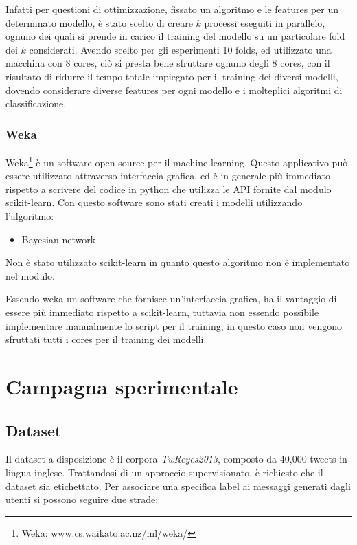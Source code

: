 \documentclass[oneside]{book}
\begin{document}
Infatti per questioni di ottimizzazione, fissato un algoritmo e le features per un determinato modello, è stato scelto di creare $k$ processi eseguiti in parallelo, ognuno dei quali si prende in carico il training del modello su un particolare fold dei $k$ considerati. Avendo scelto per gli esperimenti 10 folds, ed utilizzato una macchina con 8 cores, ciò si presta bene sfruttare ognuno degli 8 cores, con il risultato di ridurre il tempo totale impiegato per il training dei diversi modelli, dovendo considerare diverse features per ogni modello e i molteplici algoritmi di classificazione.

\subsection{Weka}

Weka\footnote{Weka: www.cs.waikato.ac.nz/ml/weka/} è un software open source per il machine learning. Questo applicativo può essere utilizzato attraverso interfaccia grafica, ed è in generale più immediato rispetto a scrivere del codice in python che utilizza le API fornite dal modulo scikit-learn. Con questo software sono stati creati i modelli utilizzando l'algoritmo:
\begin{itemize}
	\item Bayesian network
\end{itemize}
Non è stato utilizzato scikit-learn in quanto questo algoritmo non è implementato nel modulo.

Essendo weka un software che fornisce un'interfaccia grafica, ha il vantaggio di essere più immediato rispetto a scikit-learn, tuttavia non essendo possibile implementare manualmente lo script per il training, in questo caso non vengono sfruttati tutti i cores per il training dei modelli.

\chapter{Campagna sperimentale}

\section{Dataset}
Il dataset a disposizione è il corpora \emph{TwReyes2013}, composto da 40,000 tweets in lingua inglese. Trattandosi di un approccio supervisionato, è richiesto che il dataset sia etichettato. Per associare una specifica label ai messaggi generati dagli utenti si possono seguire due strade:
\end{document}
